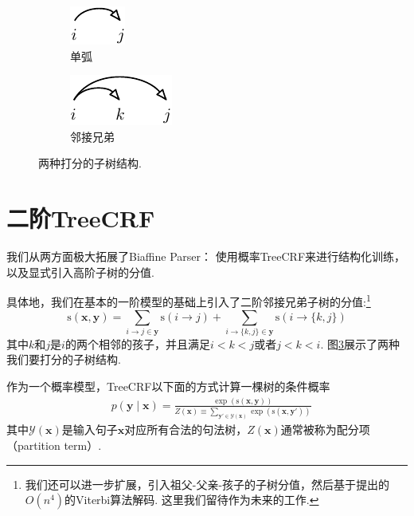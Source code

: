 \begin{figure}[tb]
  \centering
  \begin{subfigure}[b]{0.45\textwidth}
    \centering
    \includegraphics[scale=1.5]{figures/scoring-part/arc.pdf}
    \caption{单弧}
    \label{fig:scoring-part-arc}
  \end{subfigure}
  \begin{subfigure}[b]{0.45\textwidth}
    \centering
    \includegraphics[scale=1.5]{figures/scoring-part/sib.pdf}
    \caption{邻接兄弟}
    \label{fig:scoring-part-sib}
  \end{subfigure}
  \caption{两种打分的子树结构.}
  \label{fig:scoring-part}
\end{figure}

\section{二阶TreeCRF}\label{dep-2o-treecrf}
我们从两方面极大拓展了Biaffine Parser：
使用概率TreeCRF来进行结构化训练，以及显式引入高阶子树的分值.

具体地，我们在基本的一阶模型的基础上引入了二阶邻接兄弟子树的分值:\footnote{
  我们还可以进一步扩展，引入祖父-父亲-孩子的子树分值，然后基于\citet{koo-collins-2010-efficient}提出的$O(n^4)$的Viterbi算法解码.
  这里我们留待作为未来的工作.
}
\begin{equation}\label{eq:dep-2otree-score}
  \mathrm{s}(\boldsymbol{x}, \boldsymbol{y}) = \sum_{i\rightarrow j \in \boldsymbol{y}}\mathrm{s}(i\rightarrow j) + \sum_{
    i\rightarrow \{k,j\} \in \boldsymbol{y}
  } \mathrm{s}(i\rightarrow \{k,j\})
\end{equation}
其中$k$和$j$是$i$的两个相邻的孩子，并且满足$i < k < j$或者$j < k < i$.
图\ref{fig:scoring-part}展示了两种我们要打分的子树结构.

作为一个概率模型，TreeCRF以下面的方式计算一棵树的条件概率
\begin{equation}\label{eq:prob-labeled}
  \begin{split}
    & p(\boldsymbol{y}\mid\boldsymbol{x})  = \frac{\exp(\mathrm{s}(\boldsymbol{x},\boldsymbol{y}))}{Z(\boldsymbol{x}) \equiv \sum_{\boldsymbol{y'} \in \mathcal{Y}(\boldsymbol{x})} {\exp(\mathrm{s}(\boldsymbol{x},\boldsymbol{y'}))}}
  \end{split}
\end{equation}
其中$\mathcal{Y}(\boldsymbol{x})$是输入句子$\boldsymbol{x}$对应所有合法的句法树，$Z(\boldsymbol{x})$通常被称为配分项（partition term）.

